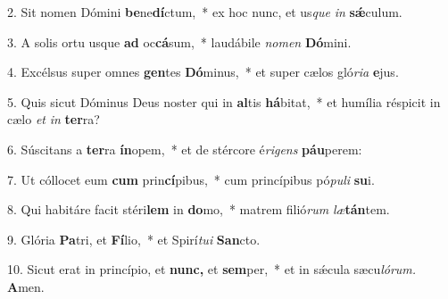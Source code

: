 \item 2. Sit nomen Dómini \textbf{be}ne\textbf{dí}ctum,~* ex hoc nunc, et us\hspace{0.03em}\textit{que} \textit{in} \textbf{sǽ}culum.
\item 3. A solis ortu usque \textbf{ad} oc\textbf{cá}sum,~* laudábile \textit{nomen} \textbf{Dó}mini.
\item 4. Excélsus super omnes \textbf{gen}tes \textbf{Dó}minus,~* et super cælos gló\textit{ria} \textbf{e}jus.
\item 5. Quis sicut Dóminus Deus noster qui in \textbf{al}tis \textbf{há}bitat,~* et humília réspicit in cælo \textit{et} \textit{in} \textbf{ter}ra?
\item 6. Súscitans a \textbf{ter}ra \textbf{ín}opem,~* et de stércore é\hspace{0.03em}\textit{rigens} \textbf{páu}perem:
\item 7. Ut cóllocet eum \textbf{cum} prin\textbf{cí}pibus,~* cum princípibus pó\textit{puli} \textbf{su}i.
\item 8. Qui habitáre facit stéri\textbf{lem} in \textbf{do}mo,~* matrem filió\textit{rum} \textit{læ}\textbf{tán}tem.
\item 9. Glória \textbf{Pa}tri, et \textbf{Fí}lio,~* et Spirí\hspace{0.03em}\textit{tui} \textbf{San}cto.
\item 10. Sicut erat in princípio, et \textbf{nunc,} et \textbf{sem}per,~* et in sǽcula sæcu\hspace{0.03em}\textit{lórum.} \textbf{A}men.
